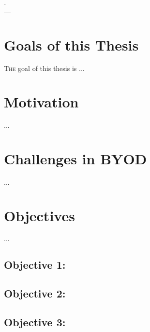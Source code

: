 \label{chap:introduction}
\begin{flushright}{\slshape
    .} \\ \medskip
    --- {}
\end{flushright}
\minitoc\mtcskip
\vfill



\section{Goals of this Thesis} %

\lettrine{T}{he} goal of this thesis is ...

\section{Motivation}
\label{sec:intro:eas}

...

\section{Challenges in BYOD}
\label{sec:intro:challenges}

...

\section{Objectives}                     
\label{sec:intro:motivation}

...

\newcommand{\objectiveparadigm}{}

 \subsection*{Objective 1: \objectiveparadigm}
\label{subsec:intro:obj:problems}

\newcommand{\objectivemethodology}{}

\subsection*{Objective 2: \objectivemethodology} 
\label{subsec:intro:obj:methodology}

\newcommand{\objectiveframework}{}

\subsection*{Objective 3: \objectiveframework}
\label{subsec:intro:obj:fwork}

